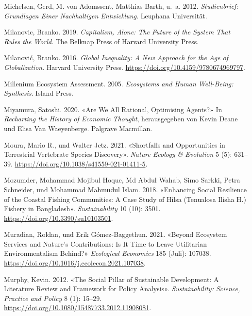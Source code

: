 \documentclass[
  nswissgerman,
  a4paper,
  openany]{book}
\newlength{\cslhangindent}
\newenvironment{CSLReferences}[2] %
 {\begin{list}{}{%
  \setlength{\itemindent}{0pt}
  \setlength{\leftmargin}{0pt}
  \setlength{\parsep}{0pt}
  \ifodd #1
   \setlength{\leftmargin}{\cslhangindent}
   \setlength{\itemindent}{-1\cslhangindent}
  \fi
  \setlength{\itemsep}{#2\baselineskip}}}
 {\end{list}}
\begin{document}
\begin{CSLReferences}{1}{1}
{Michelsen, Gerd, M. von Adomssent, Matthias Barth, u.~a.} 2012.
\emph{Studienbrief: {Grundlagen} Einer Nachhaltigen {Entwicklung}}.
Leuphana Universität.

Milanovic, Branko. 2019. \emph{Capitalism, {Alone}: {The Future} of the
{System} That {Rules} the {World}}. The Belknap Press of Harvard
University Press.

Milanović, Branko. 2016. \emph{Global {Inequality}: {A New Approach} for
the {Age} of {Globalization}}. Harvard University Press.
\url{https://doi.org/10.4159/9780674969797}.

Millenium Ecosystem Assessment. 2005. \emph{Ecosystems and {Human
Well-Being}: {Synthesis}}. Island Press.

Miyamura, Satoshi. 2020. {«Are {We All Rational}, {Optimising Agents}?»}
In \emph{Recharting the {History} of {Economic Thought}}, herausgegeben
von Kevin Deane und Elisa Van Waeyenberge. Palgrave Macmillan.

Moura, Mario R., und Walter Jetz. 2021. {«Shortfalls and Opportunities
in Terrestrial Vertebrate Species Discovery»}. \emph{Nature Ecology \&
Evolution} 5 (5): 631--39.
\url{https://doi.org/10.1038/s41559-021-01411-5}.

Mozumder, Mohammad Mojibul Hoque, Md Abdul Wahab, Simo Sarkki, Petra
Schneider, und Mohammad Mahmudul Islam. 2018. {«Enhancing {Social
Resilience} of the {Coastal Fishing Communities}: {A Case Study} of
{Hilsa} ({Tenualosa Ilisha H}.) {Fishery} in {Bangladesh}»}.
\emph{Sustainability} 10 (10): 3501.
\url{https://doi.org/10.3390/su10103501}.

Muradian, Roldan, und Erik Gómez-Baggethun. 2021. {«Beyond Ecosystem
Services and Nature's Contributions: {Is} It Time to Leave Utilitarian
Environmentalism Behind?»} \emph{Ecological Economics} 185 (Juli):
107038. \url{https://doi.org/10.1016/j.ecolecon.2021.107038}.

Murphy, Kevin. 2012. {«The Social Pillar of Sustainable Development: A
Literature Review and Framework for Policy Analysis»}.
\emph{Sustainability: Science, Practice and Policy} 8 (1): 15--29.
\url{https://doi.org/10.1080/15487733.2012.11908081}.


\end{CSLReferences}
\end{document}
